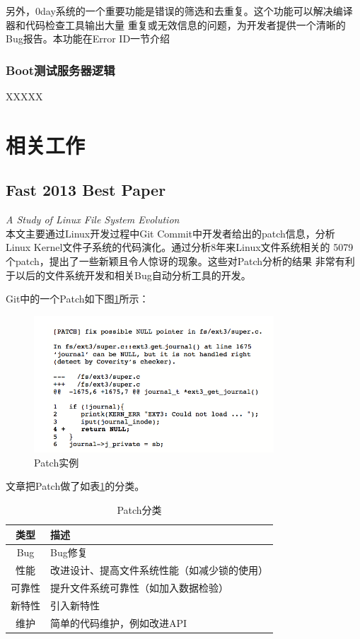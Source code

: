 \documentclass[a4paper]{article}
\begin{document}
	另外，0day系统的一个重要功能是错误的筛选和去重复。这个功能可以解决编译器和代码检查工具输出大量
	重复或无效信息的问题，为开发者提供一个清晰的Bug报告。本功能在Error
	ID一节介绍

\subsubsection{Boot测试服务器逻辑}

	XXXXX

\section{相关工作}

\subsection{Fast 2013 Best Paper}
\emph{A Study of Linux File System Evolution}\\

本文主要通过Linux开发过程中Git Commit中开发者给出的patch信息，分析
Linux Kernel文件子系统的代码演化。通过分析8年来Linux文件系统相关的
5079个patch，提出了一些新颖且令人惊讶的现象。这些对Patch分析的结果
非常有利于以后的文件系统开发和相关Bug自动分析工具的开发。

Git中的一个Patch如下图\ref{fig:patch}所示：
\begin{figure}[h]
	\begin{center}
		\includegraphics[width=0.8\textwidth]{patch.png}
	\end{center}
	\caption{Patch实例}
	\label{fig:patch}
\end{figure}

文章把Patch做了如表\ref{tab:patch_clas}的分类。

\begin{table}[h]
	\centering
	\begin{tabular}{c| p{5cm} }
		类型 &  描述 \\
		\hline
		Bug  &  Bug修复 \\
		\hline
		性能 &  改进设计、提高文件系统性能（如减少锁的使用）\\
		\hline
		可靠性 &   提升文件系统可靠性（如加入数据检验）\\
		\hline
		新特性 &  引入新特性 \\
		\hline
		维护  &  简单的代码维护，例如改进API \\

	\end{tabular}
	\caption{Patch分类}
	\label{tab:patch_clas}
\end{table}
\end{document}
